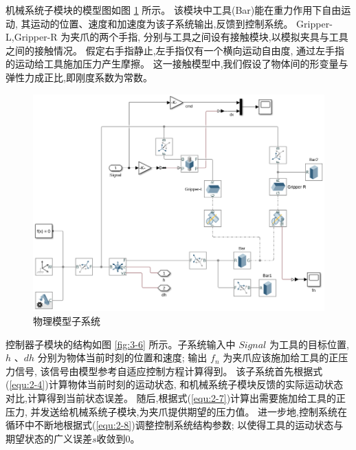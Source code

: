 机械系统子模块的模型图如图 \ref{fig:3-5} 所示。
该模块中工具(Bar)能在重力作用下自由运动,
其运动的位置、速度和加速度为该子系统输出,反馈到控制系统。
Gripper-L,Gripper-R 为夹爪的两个手指,
分别与工具之间设有接触模块,以模拟夹具与工具之间的接触情况。
假定右手指静止,左手指仅有一个横向运动自由度,
通过左手指的运动给工具施加压力产生摩擦。
这一接触模型中,我们假设了物体间的形变量与弹性力成正比,即刚度系数为常数。

\begin{figure}[!ht]
  \centering
  \includegraphics[scale=0.6]{chapter03/pic/3-5}
  \caption{物理模型子系统}
  \label{fig:3-5}
  \vspace{-0.3cm}
\end{figure}

控制器子模块的结构如图 \ref{fig:3-6} 所示。子系统输入中 $Signal$ 为工具的目标位置,
$h$ 、$dh$ 分别为物体当前时刻的位置和速度;
输出 $f_n$ 为夹爪应该施加给工具的正压力信号,
该信号由模型参考自适应控制方程计算得到。
该子系统首先根据式(\ref{equ:2-4})计算物体当前时刻的运动状态,
和机械系统子模块反馈的实际运动状态对比,计算得到当前状态误差。
随后,根据式(\ref{equ:2-7})计算出需要施加给工具的正压力,
并发送给机械系统子模块,为夹爪提供期望的压力值。
进一步地,控制系统在循环中不断地根据式(\ref{equ:2-8})调整控制系统结构参数;
以使得工具的运动状态与期望状态的广义误差$s$收敛到0。

